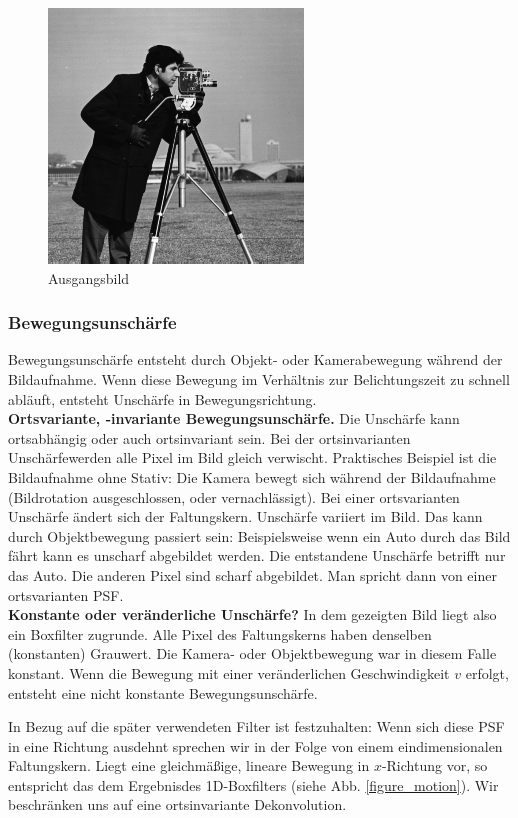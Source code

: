 \documentclass[a4paper,12pt]{article}
\begin{document}
\begin{figure}[htbp]
\centering
\includegraphics[scale=0.8]{camera.png}
\caption{Ausgangsbild}
\label{figure_camera}
\end{figure}


\subsubsection{Bewegungsunschärfe} \label{chp:einf_unschaerfe}
Bewegungsunschärfe entsteht durch Objekt- oder Kamerabewegung während der
Bildaufnahme. Wenn diese Bewegung im Verhältnis zur Belichtungszeit zu schnell
abläuft, entsteht Unschärfe in Bewegungsrichtung. \\
 \textbf{Ortsvariante, -invariante Bewegungsunschärfe.} Die Unschärfe
 kann ortsabhängig oder auch ortsinvariant sein. Bei der ortsinvarianten
 Unschärfewerden alle Pixel im Bild gleich verwischt.
 Praktisches Beispiel ist die Bildaufnahme ohne Stativ: Die Kamera
 bewegt sich während der Bildaufnahme (Bildrotation ausgeschlossen, oder vernachlässigt). 
 Bei einer ortsvarianten Unschärfe ändert sich der Faltungskern. Unschärfe variiert im Bild. Das kann
 durch Objektbewegung passiert sein: Beispielsweise wenn ein Auto durch das Bild
 fährt kann es unscharf abgebildet werden. Die entstandene Unschärfe betrifft
 nur das Auto. Die anderen Pixel sind scharf abgebildet. Man spricht dann von einer
 ortsvarianten PSF.\\
\textbf{Konstante oder veränderliche Unschärfe?} In dem gezeigten Bild liegt
also ein Boxfilter zugrunde. Alle Pixel des Faltungskerns haben denselben (konstanten)
Grauwert. Die Kamera- oder Objektbewegung war in diesem Falle konstant. Wenn die Bewegung mit
einer veränderlichen Geschwindigkeit $v$ erfolgt, entsteht eine nicht konstante
Bewegungsunschärfe.

In Bezug auf die später verwendeten Filter ist festzuhalten: Wenn sich diese PSF
in eine Richtung ausdehnt sprechen wir in der Folge von einem eindimensionalen Faltungskern. 
Liegt eine gleichmäßige, lineare Bewegung in
$x$-Richtung vor, so entspricht das dem Ergebnisdes 1D-Boxfilters (siehe Abb.
\ref{figure_motion}).
Wir beschränken uns auf eine 
ortsinvariante Dekonvolution.
 
\end{document}
